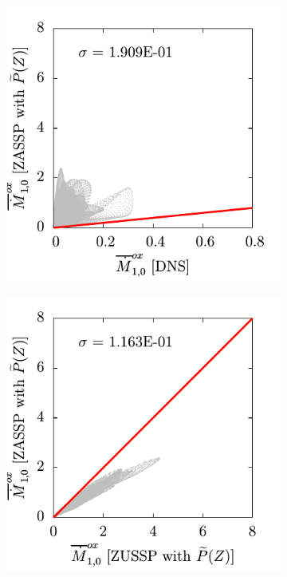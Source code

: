 \begin{figure}[ht]
  \centering
  \begin{subfigure}[b]{0.33\linewidth}
    \centering
    \includegraphics[width=\linewidth]{ch-subfiltermodeling/figures/lin-Mox5vsMox6-r3D-32}
  \end{subfigure}%
  \begin{subfigure}[b]{0.33\linewidth}
    \centering
    \includegraphics[width=\linewidth]{ch-subfiltermodeling/figures/lin-Mox5vsMox4-r3D-32}

\end{subfigure}
\end{figure}

